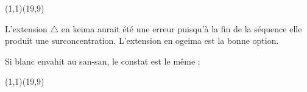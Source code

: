 \documentclass[preview, border=0pt, varwidth=false]{standalone}
\begin{document}
	\setgounit{0.4cm} 
	
\parbox[c][14.65cm][c]{10.2cm}{
	\centering
	
	\begin{psgopartialboard}{(1,1)(19,9)}
		\pass
		\pass*
	\end{psgopartialboard}
	
	\vspace{1em}
	L'extension $\triangle$ en keima aurait été une erreur puisqu'à la fin de la séquence elle produit une surconcentration. L'extension  en ogeima est la bonne option. 

	\bigskip

	Si blanc envahit au san-san, le constat est le même : 	
	\begin{psgopartialboard}{(1,1)(19,9)}
		\pass
	\end{psgopartialboard}
}
\end{document}
